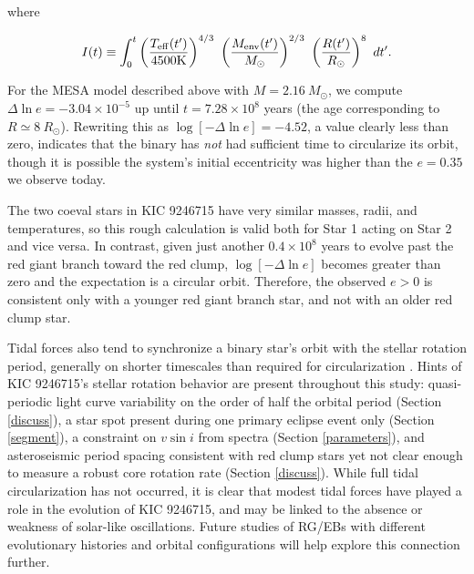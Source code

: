 where

\begin{equation}
I(t) \equiv \int_0^t \left( \frac{T_{\rm{eff}}(t')}{4500 \rm{K}} \right)^{4/3} \ \left( \frac{M_{\rm{env}}(t')}{M_{\odot}} \right)^{2/3} \ \left( \frac{R(t')}{R_{\odot}} \right)^8 \ dt'.
\end{equation}

For the MESA model described above with $M = 2.16 \ M_{\odot}$, we compute $\Delta \ln e = -3.04 \times 10^{-5}$ up until $t = 7.28 \times 10^8$ years (the age corresponding to $R \simeq 8 \ R_{\odot}$). Rewriting this as $\log [-\Delta \ln e] = -4.52$, a value clearly less than zero, indicates that the binary has \emph{not} had sufficient time to circularize its orbit, though it is possible the system's initial eccentricity was higher than the $e = 0.35$ we observe today.

The two coeval stars in KIC 9246715 have very similar masses, radii, and temperatures, so this rough calculation is valid both for Star 1 acting on Star 2 and vice versa. In contrast, given just another $0.4 \times 10^8$ years to evolve past the red giant branch toward the red clump, $\log [-\Delta \ln e]$ becomes greater than zero and the expectation is a circular orbit. Therefore, the observed $e > 0$ is consistent only with a younger red giant branch star, and not with an older red clump star.

Tidal forces also tend to synchronize a binary star's orbit with the stellar rotation period, generally on shorter timescales than required for circularization \citep{ogi14}. Hints of KIC 9246715's stellar rotation behavior are present throughout this study: quasi-periodic light curve variability on the order of half the orbital period (Section \ref{discuss}), a star spot present during one primary eclipse event only (Section \ref{segment}), a constraint on $v \sin i$ from spectra (Section \ref{parameters}), and asteroseismic period spacing consistent with red clump stars yet not clear enough to measure a robust core rotation rate (Section \ref{discuss}). While full tidal circularization has not occurred, it is clear that modest tidal forces have played a role in the evolution of KIC 9246715, and may be linked to the absence or weakness of solar-like oscillations. Future studies of RG/EBs with different evolutionary histories and orbital configurations will help explore this connection further.
  
  
  
  
  
  